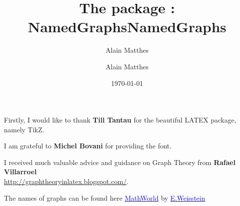 \documentclass[DIV         = 14,
               fontsize    = 10,
               headinclude = false,
               footinclude = false,
               index       = totoc,
               twoside,
               headings    = small]{tkz-doc}
\title{The package : NamedGraphs}
\author{Alain Matthes}
\gdef\tkznameofpack{NamedGraphs}
\gdef\tkzauthorofpack{Alain Matthes}
\begin{document}
\parindent=0pt
\author{\tkzauthorofpack}
\title{\tkznameofpack}
\date{\today}
\clearpage
\thispagestyle{empty}
\maketitle

\clearpage


\nameoffile{\tkznameofpack}


\presentation

\vspace{1cm}

\tkzHand Firstly, I would like to thank \textbf{Till Tantau} for the  beautiful LATEX package, namely TikZ.

\tkzHand I am grateful to  \textbf{Michel Bovani} for providing the  font.

\tkzHand I received much valuable advice and guidance on Graph Theory from \textbf{Rafael Villarroel}\\ \url{http://graphtheoryinlatex.blogspot.com/}.

\tkzHand The names of  graphs can be found here  \href{http://mathworld.wolfram.com/topics/SimpleGraphs.html}%
           {\textcolor{blue}{MathWorld}} by \href{http://en.wikipedia.org/wiki/Eric_W._Weisstein}%
           {\textcolor{blue}{E.Weisstein}}


\clearpage
\tableofcontents

\clearpage\newpage

\setlength{\parskip}{1ex plus 0.5ex minus 0.2ex}































\clearpage\newpage
\printindex
\end{document}
